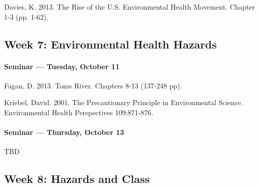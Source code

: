       \begin{itemize*}
      \item Davies, K. 2013. The Rise of the U.S. Environmental Health Movement. Chapter 1-3 (pp. 1-62).	
      \end{itemize*}
      
      
      
      \subsection{\textbf{Week 7:} Environmental Health Hazards}
      
      \paragraph{Seminar --- Tuesday, October 11}
      
      \begin{itemize*}
      \item Fagan, D. 2013. Toms River. Chapters 8-13 (137-248 pp).
      \item Kriebel, David. 2001. The Precautionary Principle in Environmental Science. Environmental Health Perspectives 109:871-876.
      \end{itemize*}
      

      
      \paragraph{Seminar --- Thursday, October 13}
      
      \begin{itemize*}
      \item TBD			
      \end{itemize*}
    
      
      
      \subsection{\textbf{Week 8}: Hazards and Class}
      
